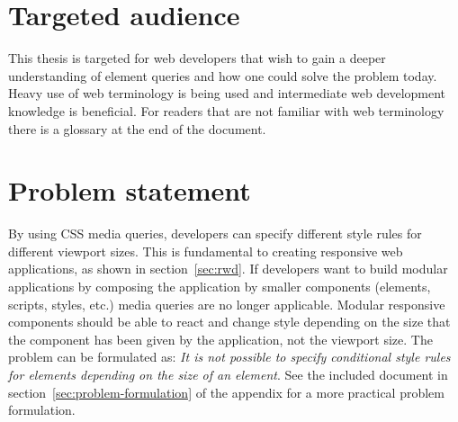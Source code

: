 \documentclass[a4paper,11pt]{kth-mag}
\begin{document}
    \section{Targeted audience}
      This thesis is targeted for \gls{web} developers that wish to gain a deeper understanding of element queries and how one could solve the problem today.
      Heavy use of \gls{web} terminology is being used and intermediate \gls{web} development knowledge is beneficial.
      For readers that are not familiar with web terminology there is a glossary at the end of the document.
    \section{Problem statement}\label{sec:problem}
      By using \gls{CSS} \gls{media queries}, developers can specify different style rules for different \gls{viewport} sizes.
      This is fundamental to creating \gls{responsive} \gls{web} applications, as shown in section~\ref{sec:rwd}.
      If developers want to build modular applications by composing the application by smaller components (\glspl{element}, scripts, styles, etc.) \gls{media queries} are no longer applicable.
      Modular \gls{responsive} components should be able to react and change style depending on the size that the component has been given by the application, not the \gls{viewport} size. 
      The problem can be formulated as: \emph{It is not possible to specify conditional style rules for \glspl{element} depending on the size of an element}.
      See the included document in section~\ref{sec:problem-formulation} of the appendix for a more practical problem formulation.
\end{document}
